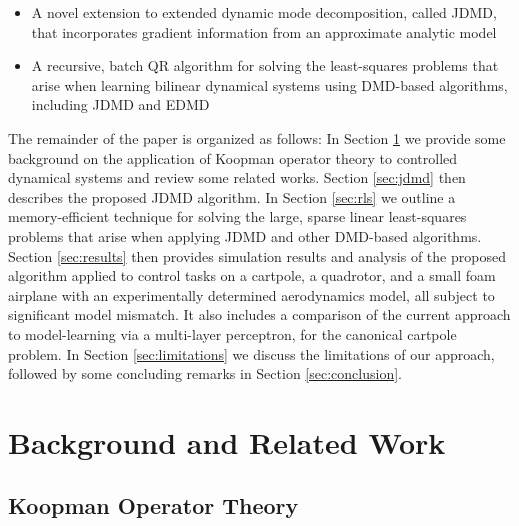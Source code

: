 \documentclass[../root.tex]{subfiles}
\newcommand{\changed}[1]{{\color{black} #1}}
\begin{document}
\begin{itemize}
  \item A novel extension to extended dynamic mode decomposition, called JDMD, that
  incorporates gradient information from an approximate analytic model
  
  \item A recursive, batch QR algorithm for solving the least-squares problems that arise 
  when learning bilinear dynamical systems using DMD-based algorithms, including JDMD and EDMD
  
\end{itemize}

The remainder of the paper is organized as follows: In Section
\ref{sec:Preliminaries/Background} we provide some background on the application of Koopman
operator theory to controlled dynamical systems and review some related works.  Section
\ref{sec:jdmd} then describes the proposed JDMD algorithm.  In Section \ref{sec:rls} we
outline a memory-efficient technique for solving the large, sparse linear least-squares
problems that arise when applying JDMD and other DMD-based algorithms.  
Section \ref{sec:results} then
provides simulation results and analysis of the proposed algorithm applied to control tasks
on a cartpole, 
a quadrotor, and a small foam airplane \changed{with an experimentally determined aerodynamics model}, 
all subject to significant model mismatch. 
\changed{It also includes a comparison of the current approach to model-learning via a multi-layer
perceptron, for the canonical cartpole problem.} 
In Section \ref{sec:limitations} we discuss the limitations of our approach,
followed by some concluding remarks in Section \ref{sec:conclusion}.

\section{Background and Related Work} \label{sec:Preliminaries/Background}

\subsection{Koopman Operator Theory}
\end{document}
